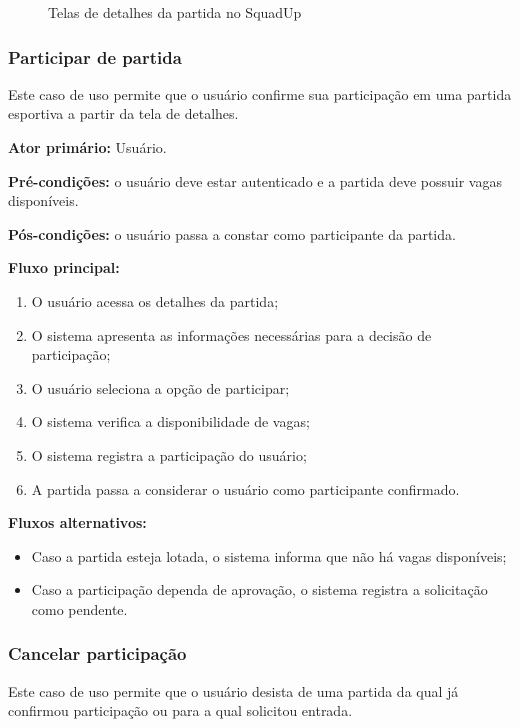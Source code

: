 \documentclass[a4paper, 12pt]{article}
\begin{document}
\begin{justify}
\begin{figure}[H]
    \caption{Telas de detalhes da partida no SquadUp}
    \label{fig:app_detalhes_partida}
\end{figure}

\subsubsection{Participar de partida}

Este caso de uso permite que o usuário confirme sua participação em uma partida esportiva a partir da tela de detalhes.

\textbf{Ator primário:} Usuário.

\textbf{Pré-condições:} o usuário deve estar autenticado e a partida deve possuir vagas disponíveis.

\textbf{Pós-condições:} o usuário passa a constar como participante da partida.

\textbf{Fluxo principal:}

\begin{enumerate}
    \item O usuário acessa os detalhes da partida;
    \item O sistema apresenta as informações necessárias para a decisão de participação;
    \item O usuário seleciona a opção de participar;
    \item O sistema verifica a disponibilidade de vagas;
    \item O sistema registra a participação do usuário;
    \item A partida passa a considerar o usuário como participante confirmado.
\end{enumerate}

\textbf{Fluxos alternativos:}

\begin{itemize}
    \item Caso a partida esteja lotada, o sistema informa que não há vagas disponíveis;
    \item Caso a participação dependa de aprovação, o sistema registra a solicitação como pendente.
\end{itemize}

\subsubsection{Cancelar participação}

Este caso de uso permite que o usuário desista de uma partida da qual já confirmou participação ou para a qual solicitou entrada.


\end{justify}
\end{document}
